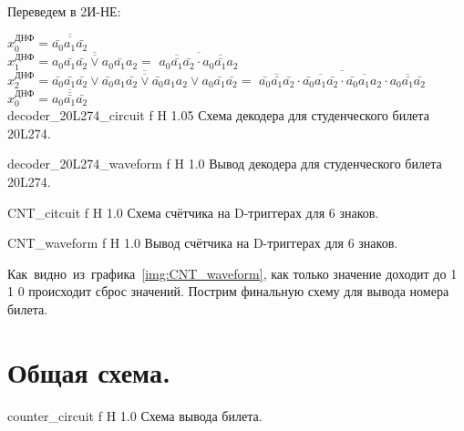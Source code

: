\documentclass{bmstu}
\begin{document}
	\begin{flushleft}
		Переведем в 2И-НЕ: 
	\end{flushleft}
	
	$x_0^{\text{ДНФ}} = \overline{\overline{\bar{a_0} a_1 \bar{a_2}}}$ \\
	$x_1^{\text{ДНФ}} = \overline{\overline{a_0 \bar{a_1} \bar{a_2} \vee a_0 \bar{a_1} a_2}} =$ $\overline{\overline{a_0 \bar{a_1} \bar{a_2}} \cdot \overline{a_0 \bar{a_1} a_2}}$ \\
	$x_2^{\text{ДНФ}} = \overline{\overline{\bar{a_0} \bar{a_1} \bar{a_2} \vee \bar{a_0} a_1 \bar{a_2} \vee \bar{a_0} a_1 a_2 \vee a_0 \bar{a_1} \bar{a_2}}} =$
	$\overline{\overline{\bar{a_0} \bar{a_1} \bar{a_2}} \cdot \overline{\bar{a_0} a_1 \bar{a_2}} \cdot \overline{\bar{a_0} a_1 a_2} \cdot \overline{a_0 \bar{a_1} \bar{a_2}}}$ \\
	$x_0^{\text{ДНФ}} = \overline{\overline{a_0 \bar{a_1} \bar{a_2}}}$ \\
	
	{decoder_20L274_circuit}
	{f} %
	{H} %
	{1.05\textwidth} %
	{Схема декодера для студенческого билета 20L274.} %
	
	{decoder_20L274_waveform}
	{f} %
	{H} %
	{1.0\textwidth} %
	{Вывод декодера для студенческого билета 20L274.} %
	
	{CNT_citcuit}
	{f} %
	{H} %
	{1.0\textwidth} %
	{Схема счётчика на D-триггерах для 6 знаков.} %
	
	{CNT_waveform}
	{f} %
	{H} %
	{1.0\textwidth} %
	{Вывод счётчика на D-триггерах для 6 знаков.} %
	
	\begin{flushleft}
		Как~видно~из~графика~\ref{img:CNT_waveform}, как только значение доходит
		до 1 1 0 происходит сброс значений. Пострим финальную схему для вывода
		номера билета.
	\end{flushleft}
	
	\section{Общая схема.}
	{counter_circuit}
	{f} %
	{H} %
	{1.0\textwidth} %
	{Схема вывода билета.} %
	
\end{document}
